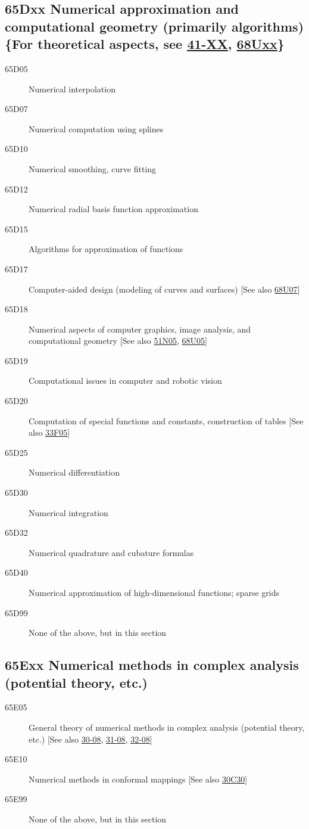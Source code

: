 \subsection*{65Dxx  Numerical approximation and computational geometry (primarily algorithms) \{For theoretical aspects, see \hyperref[41-XX]{41-XX}, \hyperref[68Uxx]{68Uxx}\} }\label{65Dxx}
\begin{description}  
\item [65D05]\label{65D05} Numerical interpolation
\item [65D07]\label{65D07} Numerical computation using splines
\item [65D10]\label{65D10} Numerical smoothing, curve fitting
\item [65D12]\label{65D12} Numerical radial basis function approximation
\item [65D15]\label{65D15} Algorithms for approximation of functions
\item [65D17]\label{65D17} Computer-aided design (modeling of curves and surfaces) [See also \hyperref[68U07]{68U07}]
\item [65D18]\label{65D18} Numerical aspects of computer graphics, image analysis, and computational geometry [See also \hyperref[51N05]{51N05}, \hyperref[68U05]{68U05}]
\item [65D19]\label{65D19} Computational issues in computer and robotic vision
\item [65D20]\label{65D20} Computation of special functions and constants, construction of tables [See also \hyperref[33F05]{33F05}]
\item [65D25]\label{65D25} Numerical differentiation
\item [65D30]\label{65D30} Numerical integration
\item [65D32]\label{65D32} Numerical quadrature and cubature formulas
\item [65D40]\label{65D40} Numerical approximation of high-dimensional functions; sparse grids
\item [65D99]\label{65D99} None of the above, but in this section
\end{description}
\subsection*{65Exx  Numerical methods in complex analysis (potential theory, etc.) }\label{65Exx}
\begin{description}  
\item [65E05]\label{65E05} General theory of numerical methods in complex analysis (potential theory, etc.) [See also \hyperref[30-08]{30-08}, \hyperref[31-08]{31-08}, \hyperref[32-08]{32-08}]
\item [65E10]\label{65E10} Numerical methods in conformal mappings [See also \hyperref[30C30]{30C30}]
\item [65E99]\label{65E99} None of the above, but in this section
\end{description}
